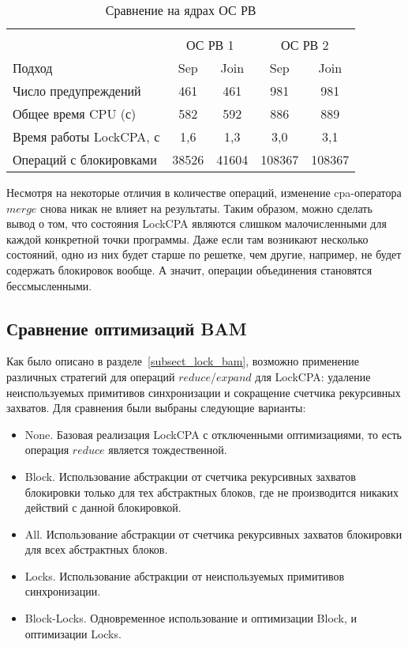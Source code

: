   \begin{table}[h]\footnotesize \centering
    \caption{Сравнение на ядрах ОС РВ}
  	\label{table-os-lock-merge}
    \begin{tabular}{ | l | c | c | c | c | }
      \hline
      		& 		\multicolumn{4}{c|}{\theory}  \\
      		& 		\multicolumn{2}{c|}{ОС РВ 1} & \multicolumn{2}{c|}{ОС РВ 2}  \\
      Подход         					& Sep 	& Join 	& Sep 	& Join   	\\ \hline
      Число предупреждений				& 461   & 461   & 981   & 981   	\\ 
  	  Общее время CPU (с) 				& 582 	& 592 	& 886   & 889     	\\ 
  \hspace{0.5cm} Время работы LockCPA, с & 1,6 	& 1,3 	& 3,0   & 3,1     	\\ \hline
   	  Операций с блокировками			& 38526 & 41604 & 108367 & 108367      	\\ 
      \hline
    \end{tabular}
  \end{table}


Несмотря на некоторые отличия в количестве операций, изменение cpa-оператора $merge$ снова никак не влияет на результаты.
Таким образом, можно сделать вывод о том, что состояния LockCPA являются слишком малочисленными для каждой конкретной точки программы.
Даже если там возникают несколько состояний, одно из них будет старше по решетке, чем другие, например, не будет содержать блокировок вообще. 
А значит, операции объединения становятся бессмысленными.

\subsection{Сравнение оптимизаций BAM}

Как было описано в разделе~\ref{subsect_lock_bam}, возможно применение различных стратегий для операций $reduce$/$expand$ для LockCPA: удаление неиспользуемых примитивов синхронизации и сокращение счетчика рекурсивных захватов. 
Для сравнения были выбраны следующие варианты:

\begin{itemize}
\item None. Базовая реализация LockCPA с отключенными оптимизациями, то есть операция $reduce$ является тождественной.
\item Block. Использование абстракции от счетчика рекурсивных захватов блокировки только для тех абстрактных блоков, где не производится никаких действий с данной блокировкой.
\item All. Использование абстракции от счетчика рекурсивных захватов блокировки для всех абстрактных блоков.
\item Locks. Использование абстракции от неиспользуемых примитивов синхронизации.
\item Block-Locks. Одновременное использование и оптимизации Block, и оптимизации Locks.
\end{itemize}

